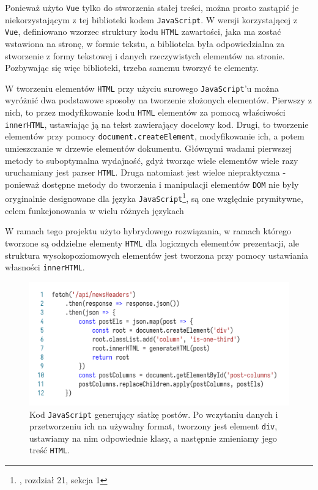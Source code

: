 \documentclass[licencjacka]{pracadypl}
\begin{document}
Ponieważ użyto \texttt{Vue} tylko do stworzenia stałej treści, można prosto zastąpić je niekorzystającym z tej biblioteki kodem \texttt{JavaScript}. W wersji korzystającej z \texttt{Vue}, definiowano wzorzec struktury kodu \texttt{HTML} zawartości, jaka ma zostać wstawiona na stronę, w formie tekstu, a biblioteka była odpowiedzialna za stworzenie z formy tekstowej i danych rzeczywistych elementów na stronie. Pozbywając się więc biblioteki, trzeba samemu tworzyć te elementy.

W tworzeniu elementów \texttt{HTML} przy użyciu surowego \texttt{JavaScript}'u można wyróżnić dwa podstawowe sposoby na tworzenie złożonych elementów. Pierwszy z nich, to przez modyfikowanie kodu \texttt{HTML} elementów za pomocą właściwości \texttt{innerHTML}, ustawiając ją na tekst zawierający docelowy kod. Drugi, to tworzenie elementów przy pomocy \texttt{document.createElement}, modyfikowanie ich, a potem umieszczanie w drzewie elementów dokumentu. Głównymi wadami pierwszej metody to suboptymalna wydajność, gdyż tworząc wiele elementów wiele razy uruchamiany jest parser \texttt{HTML}. Druga natomiast jest wielce niepraktyczna - ponieważ dostępne metody do tworzenia i manipulacji elementów \texttt{DOM} nie były oryginalnie designowane dla języka \texttt{JavaScript}\footnote{\cite{wspr}, rozdział 21, sekcja 1}, są one względnie prymitywne, celem funkcjonowania w wielu różnych językach

W ramach tego projektu użyto hybrydowego rozwiązania, w ramach którego tworzone są oddzielne elementy \texttt{HTML} dla logicznych elementów prezentacji, ale struktura wysokopoziomowych elementów jest tworzona przy pomocy ustawiania własności \texttt{innerHTML}.

\begin{figure}[H]
  \centering
  \includegraphics[width=\linewidth]{images/code-js-elem-gen.png}
  \caption{Kod \texttt{JavaScript} generujący siatkę postów. Po wczytaniu danych i przetworzeniu ich na używalny format, tworzony jest element \texttt{div}, ustawiamy na nim odpowiednie klasy, a następnie zmieniamy jego treść \texttt{HTML}.}
  \label{fig:code-js-elem-gen}
\end{figure}
\end{document}
